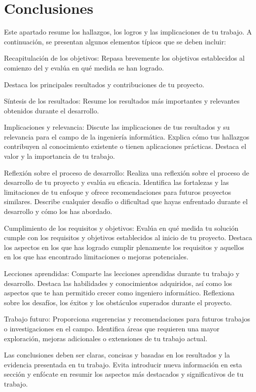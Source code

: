 \chapter{Conclusiones}\label{ch:chapter_6}


Este apartado resume los hallazgos, los logros y las implicaciones de tu trabajo.
A continuación, se presentan algunos elementos típicos que se deben incluir:

Recapitulación de los objetivos: Repasa brevemente los objetivos establecidos al comienzo del y evalúa en qué medida se
han logrado.

Destaca los principales resultados y contribuciones de tu proyecto.

Síntesis de los resultados: Resume los resultados más importantes y relevantes obtenidos durante el desarrollo.

Implicaciones y relevancia: Discute las implicaciones de tus resultados y su relevancia para el campo
de la ingeniería informática.
Explica cómo tus hallazgos contribuyen al conocimiento existente o tienen aplicaciones prácticas.
Destaca el valor y la importancia de tu trabajo.

Reflexión sobre el proceso de desarrollo: Realiza una reflexión sobre el proceso de desarrollo de tu proyecto y evalúa
su eficacia.
Identifica las fortalezas y las limitaciones de tu enfoque y ofrece recomendaciones para futuros proyectos similares.
Describe cualquier desafío o dificultad que hayas enfrentado durante el desarrollo y cómo los has abordado.

Cumplimiento de los requisitos y objetivos: Evalúa en qué medida tu solución cumple con los requisitos y objetivos
establecidos al inicio de tu proyecto.
Destaca los aspectos en los que has logrado cumplir plenamente los requisitos y aquellos en los que has encontrado
limitaciones o mejoras potenciales.

Lecciones aprendidas: Comparte las lecciones aprendidas durante tu trabajo y desarrollo.
Destaca las habilidades y conocimientos adquiridos, así como los aspectos que te han permitido crecer como ingeniero
informático.
Reflexiona sobre los desafíos, los éxitos y los obstáculos superados durante el proyecto.

Trabajo futuro: Proporciona sugerencias y recomendaciones para futuros trabajos o investigaciones en el campo.
Identifica áreas que requieren una mayor exploración, mejoras adicionales o extensiones de tu trabajo actual.

Las conclusiones deben ser claras, concisas y basadas en los resultados y la evidencia presentada en tu trabajo.
Evita introducir nueva información en esta sección y enfócate en
resumir los aspectos más destacados y significativos de tu trabajo.


